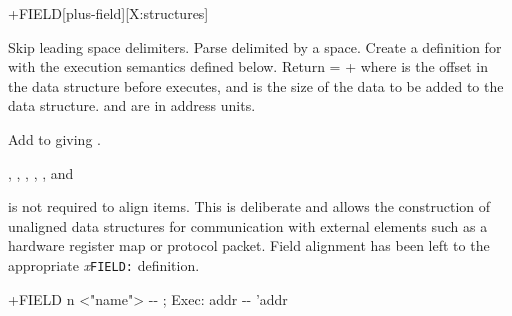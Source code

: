 
\begin{worddef}{}{+FIELD}[plus-field][X:structures]
\item {}

	Skip leading space delimiters.  Parse  delimited
	by a space.  Create a definition for  with the
	execution semantics defined below.  Return  =
	 +  where  is the offset
	in the data structure before  executes, and
	 is the size of the data to be added to the data
	structure.  and  are in address units.

\execute[name]

	Add  to  giving .

\see {},
	,
	,
	,
	,
	 and

	\begin{defer}
	\rationale
		 is not required to align items.  This is
		deliberate and allows the construction of unaligned data
		structures for communication with external elements such
		as a hardware register map or protocol packet.
		Field alignment has been left to the appropriate
		\emph{x}\texttt{FIELD:} definition.

	\implementation

		\word{:} +FIELD\tab{} n <"name"> -{}- ; Exec: addr -{}- 'addr \\
		\tab {}  \word{,} \word{+} \\
		\tab {}  \word{+} \\
		\word{;}
	\end{defer}
\end{worddef}


